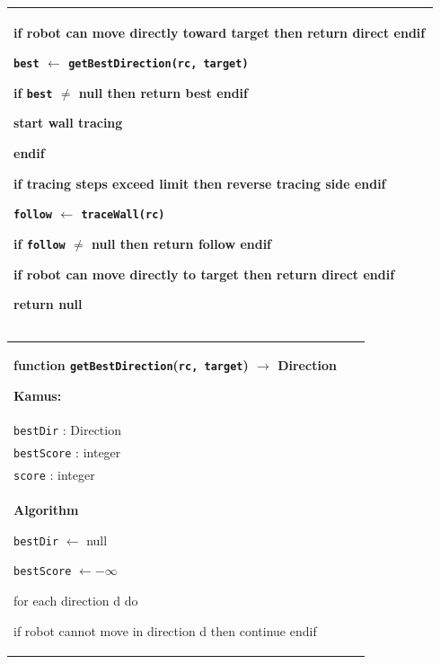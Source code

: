 \documentclass{article}
\newenvironment{pseudobox}
{
\centering
\begin{longtable}{|p{0.94\linewidth}|}
\hline
}
{
\\ \hline
\end{longtable}
\vspace{0.05cm}
}
\begin{document}
\begin{enumerate}[label=\alph*.]
\begin{pseudobox}
\hspace*{3em}if robot can move directly toward target then return direct endif

\hspace*{3em}\texttt{best} $\leftarrow$ \texttt{getBestDirection(rc, target)}

\hspace*{3em}if \texttt{best} $\neq$ null then return best endif

\hspace*{3em}start wall tracing

\hspace*{1.5em}endif

\hspace*{1.5em}if tracing steps exceed limit then reverse tracing side endif

\hspace*{1.5em}\texttt{follow} $\leftarrow$ \texttt{traceWall(rc)}

\hspace*{1.5em}if \texttt{follow} $\neq$ null then return follow endif

\hspace*{1.5em}if robot can move directly to target then return direct endif

\hspace*{1.5em}return null
\end{pseudobox}

\begin{pseudobox}
\textbf{function \texttt{getBestDirection}(\texttt{rc, target}) $\rightarrow$ Direction}

\textbf{Kamus:} \\
\hspace*{1.5em}\texttt{bestDir} : Direction \\
\hspace*{1.5em}\texttt{bestScore} : integer \\
\hspace*{1.5em}\texttt{score} : integer \\

\textbf{Algorithm}

\hspace*{1.5em}\texttt{bestDir} $\leftarrow$ null

\hspace*{1.5em}\texttt{bestScore} $\leftarrow -\infty$

\hspace*{1.5em}for each direction d do

\hspace*{3em}if robot cannot move in direction d then continue endif


\end{pseudobox}
\end{enumerate}
\end{document}
